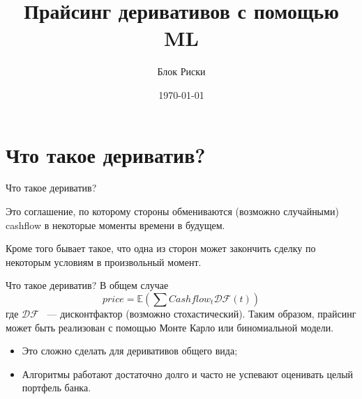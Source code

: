 \documentclass[10pt]{beamer}
\newcommand{\E}{\ensuremath{\mathbb{E}}}
\begin{document}
    \title[NN-based pricing]{Прайсинг деривативов с помощью ML}
    \author{Блок Риски}
    \date{\today}

    \begin{frame}
        \titlepage
    \end{frame}

    \section{Что такое дериватив?}
    \begin{frame}{Что такое дериватив?}

        Это соглашение, по которому стороны обмениваются (возможно случайными) cashflow в некоторые моменты времени в будущем.


        Кроме того бывает такое, что одна из сторон может закончить сделку по некоторым условиям в произвольный момент.
    \end{frame}

    \begin{frame}{Что такое дериватив?}
        В общем случае
        \[
            price = \E \left( \sum Cashflow_t \mathcal{DF}(t) \right)
        \]
        где $\mathcal{DF}$ ~--- дисконтфактор (возможно стохастический).
        Таким образом, прайсинг может быть реализован с помощью Монте Карло или биномиальной модели.
        \begin{itemize}
            \item Это сложно сделать для деривативов общего вида;
            \item Алгоритмы работают достаточно долго и часто не успевают оценивать целый портфель банка.
        \end{itemize}
    \end{frame}
\end{document}
